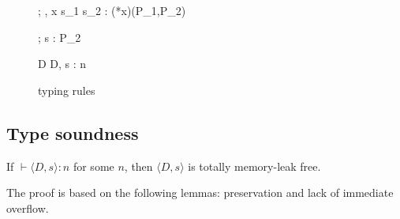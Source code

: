 \begin{figure}
\begin{minipage}{\textwidth}
{\Theta ; \Gamma, x \vdash \IFNULL\Sirx \; \THEN s_{1}\; \ELSE s_{2} : (*x)(P_1,P_2)}


{\Theta ; \Gamma \vdash s : P_{2}}

        {\vdash D \COL \Theta}
{\vdash \langle D, s \rangle : n}

\end{minipage}
\caption{typing rules}
\label{fig:TypingRules}
\end{figure}

\subsection{Type soundness}
\begin{theorem}\label{thm1}
If $\vdash \langle D, s \rangle : n$ for some \(n\), then \(\langle D,
s \rangle\) is totally memory-leak free.
\end{theorem}

The proof is based on the following lemmas: preservation and lack of
immediate overflow.


